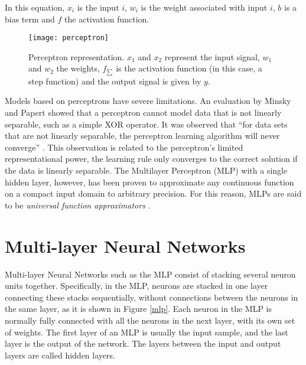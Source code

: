 In this equation, $x_{i}$ is the input $i$, $w_{i}$ is the weight associated with input $i$, $b$ is a
bias term and $f$ the activation function. 
\begin{figure}[!htb]
\centering
\texttt{[image: perceptron]}
\caption{Perceptron representation. $x_{1}$ and $x_{2}$ represent the input signal, $w_{1}$ and $w_{2}$ the weights, $f_{\sum}$ is the activation function (in this case, a step function) and the output signal is given by $y$.}
\label{perceptron}
\end{figure}



Models based on perceptrons have severe limitations. An evaluation by Minsky and Papert \cite{papert1969perceptrons} showed that a perceptron cannot model data that is not linearly separable, such as a simple XOR operator. It was observed that ``for data sets that are not linearly separable, the perceptron learning algorithm will never converge'' \cite{bishop2006pattern}. This observation is related to the perceptron's limited representational power, the learning rule only converges to the correct solution if the data is linearly separable. The Multilayer Perceptron (MLP) with a single hidden layer, however, has been proven \cite{hornik1989multilayer} to approximate any continuous function on a compact input domain to arbitrary precision. For this reason, MLPs are said to be \textit{universal function approximators} \cite{hornik1989multilayer}.

\section{Multi-layer Neural Networks}
Multi-layer Neural Networks such as the MLP consist of stacking several neuron units together. Specifically, in the MLP, neurons are stacked in one layer connecting these stacks sequentially, without connections between the neurons in the same layer, as it is shown in Figure \ref{mlp}. Each neuron in the MLP is normally fully connected with all the neurons in the next layer, with its own set of weights. The first layer of an MLP is usually the input sample, and the last layer is the output of the network. The layers between the input and output layers are called hidden layers.

